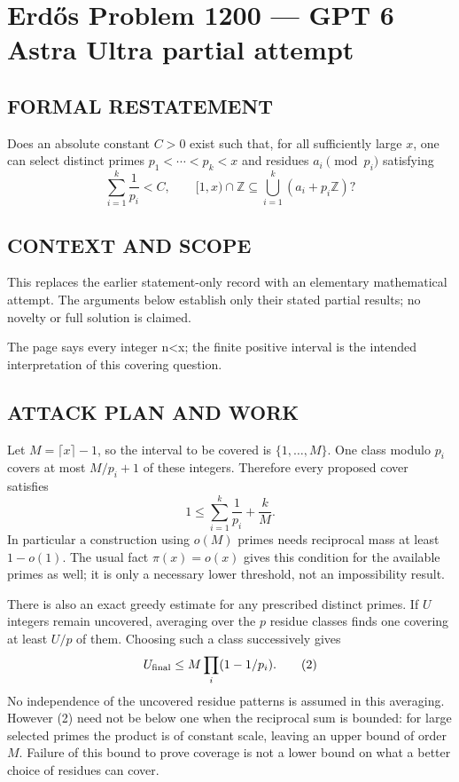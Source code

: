 \section*{Erd\H{o}s Problem 1200 --- GPT 6 Astra Ultra partial attempt}


\subsection*{FORMAL RESTATEMENT}
Does an absolute constant $C>0$ exist such that, for all sufficiently large $x$, one can select distinct primes $p_1<\cdots<p_k<x$ and residues $a_i\pmod{p_i}$ satisfying
\[\sum_{i=1}^k\frac1{p_i}<C,\qquad
[1,x)\cap\mathbb Z\subseteq\bigcup_{i=1}^k(a_i+p_i\mathbb Z)?\]

\subsection*{CONTEXT AND SCOPE}
This replaces the earlier statement-only record with an elementary mathematical attempt. The arguments below establish only their stated partial results; no novelty or full solution is claimed.

The page says every integer n<x; the finite positive interval is the intended interpretation of this covering question.

\subsection*{ATTACK PLAN AND WORK}
Let $M=\lceil x\rceil-1$, so the interval to be covered is $\{1,\ldots,M\}$.
One class modulo $p_i$ covers at most $M/p_i+1$ of these integers. Therefore
every proposed cover satisfies
\[1\le\sum_{i=1}^k\frac1{p_i}+\frac kM.\tag{1}\]
In particular a construction using $o(M)$ primes needs reciprocal mass at least
$1-o(1)$. The usual fact $\pi(x)=o(x)$ gives this condition for the available
primes as well; it is only a necessary lower threshold, not an impossibility result.

There is also an exact greedy estimate for any prescribed distinct primes.
If $U$ integers remain uncovered, averaging over the $p$ residue classes finds
one covering at least $U/p$ of them. Choosing such a class successively gives
\[U_{\rm final}\le M\prod_i(1-1/p_i).\tag{2}\]
No independence of the uncovered residue patterns is assumed in this averaging.
However (2) need not be below one when the reciprocal sum is bounded: for
large selected primes the product is of constant scale, leaving an upper bound
of order $M$. Failure of this bound to prove coverage is not a lower bound on
what a better choice of residues can cover.

